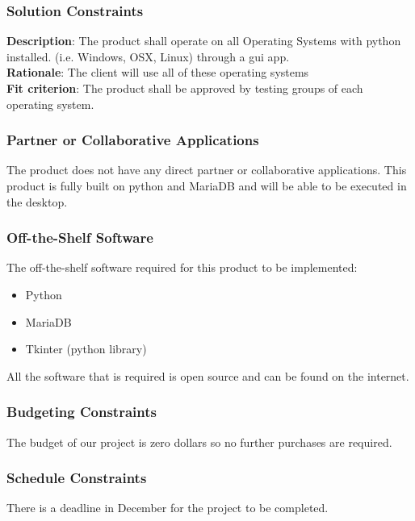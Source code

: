 \documentclass[12pt, titlepage]{article}
\begin{document}
\subsubsection{Solution Constraints}

\textbf{Description}: The product shall operate on all Operating Systems with python installed. (i.e. Windows, OSX, Linux) through a gui app.
\\
\textbf{Rationale}: The client will use all of these operating systems
\\
\textbf{Fit criterion}: The product shall be approved by testing groups of each operating system.

\subsubsection{Partner or Collaborative Applications}

The product does not have any direct partner or collaborative applications. This product is fully built on python and MariaDB and will be able to be executed in the desktop.

\subsubsection{Off-the-Shelf Software}

The off-the-shelf software required for this product to be implemented:
\begin{itemize}
\item Python
\item MariaDB
\item Tkinter (python library)
\end{itemize}
All the software that is required is open source and can be found on the internet.

\subsubsection{Budgeting Constraints}

The budget of our project is zero dollars so no further purchases are required.

\subsubsection{Schedule Constraints}

There is a deadline in December for the project to be completed.
\end{document}
